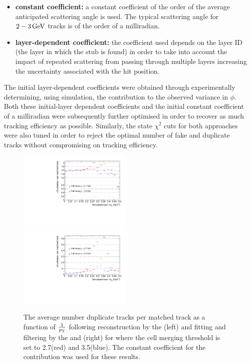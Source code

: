 \begin{itemize}
\item \textbf{constant coefficient:} a constant coefficient of the order of the average anticipated scattering angle is used. The typical scattering angle for $2-3\,\text{Ge\hspace{-.08em}V}$ tracks is of the order of a milliradian.
\item \textbf{layer-dependent coefficient:} the coefficient used depends on the layer ID (\ie the layer in which the stub is found) in order to take into account the impact of repeated scattering from passing through multiple layers increasing the uncertainty associated with the hit position.
\end{itemize}

The initial layer-dependent coefficients were obtained through experimentally determining, using simulation, the \MS contribution to the observed variance in $\phi$.
Both these initial-layer dependent coefficients and the initial constant coefficient of a milliradian were subsequently further optimised in order to recover as much tracking efficiency as  possible.
Similarly, the \KF state $\chi^{2}$ cuts for both approaches were also tuned in order to reject the optimal number of fake and duplicate tracks without compromising on tracking efficiency.

\begin{figure}[htb]
\centering
\includegraphics[width=0.495\textwidth]{figs/tk-upgrade/results-lowPtTracking/htAvgNumDuplicatesVsInvPtTiltedGeometry_5000.pdf}
\includegraphics[width=0.495\textwidth]{figs/tk-upgrade/results-lowPtTracking/kfAvgNumDuplicatesVsInvPtTiltedGeometry_5000.pdf}
\caption{The average number duplicate tracks per matched track as a function of $\frac{1}{p_{\mathrm{T}}}$ following reconstruction by the \HT (left) and fitting and filtering by the \KF and \DR (right) for where the \HT cell merging \pT threshold is set to 2.7\GeV (red) and 3.5\GeV (blue). 
The constant coefficient for the \MS contribution was used for these \KF results.
}
\label{fig:2GeVfracDups}
\end{figure}

